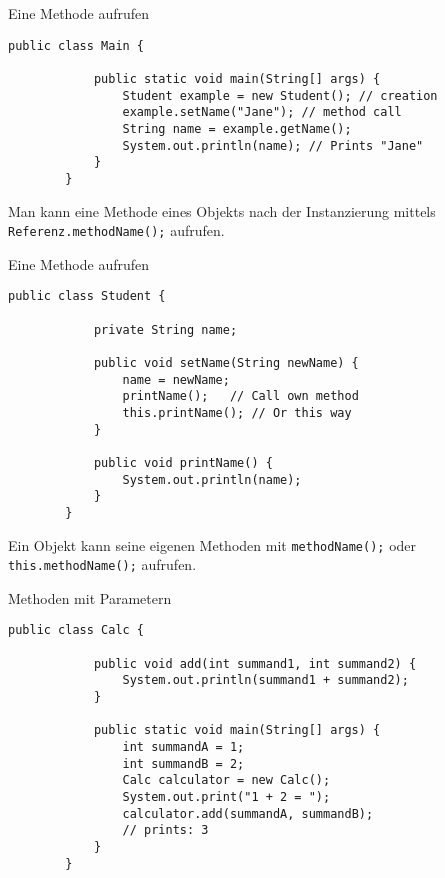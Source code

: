 \begin{frame}[fragile]{Eine Methode aufrufen}
    \begin{lstlisting}[gobble=8]
        public class Main {

            public static void main(String[] args) {
                Student example = new Student(); // creation
                example.setName("Jane"); // method call
                String name = example.getName(); 
                System.out.println(name); // Prints "Jane"
            } 
        }
    \end{lstlisting}
	Man kann eine Methode eines Objekts nach der Instanzierung mittels \texttt{Referenz.methodName();} aufrufen.
\end{frame}

\begin{frame}[fragile]{Eine Methode aufrufen}
    \begin{lstlisting}[gobble=8]
        public class Student {
        
            private String name;
        
            public void setName(String newName) {
                name = newName;
                printName();   // Call own method
                this.printName(); // Or this way
            }
            
            public void printName() {
                System.out.println(name);
            }
        }
    \end{lstlisting}
	Ein Objekt kann seine eigenen Methoden mit \texttt{methodName();} oder \texttt{this.methodName();} aufrufen.
\end{frame}

\begin{frame}[fragile]{Methoden mit Parametern}
    \begin{lstlisting}[gobble=8]
        public class Calc {

            public void add(int summand1, int summand2) {
                System.out.println(summand1 + summand2);
            }
                
            public static void main(String[] args) {
                int summandA = 1;
                int summandB = 2;
                Calc calculator = new Calc();
                System.out.print("1 + 2 = ");
                calculator.add(summandA, summandB); 
                // prints: 3
            }    
        }
	\end{lstlisting}
\end{frame}

